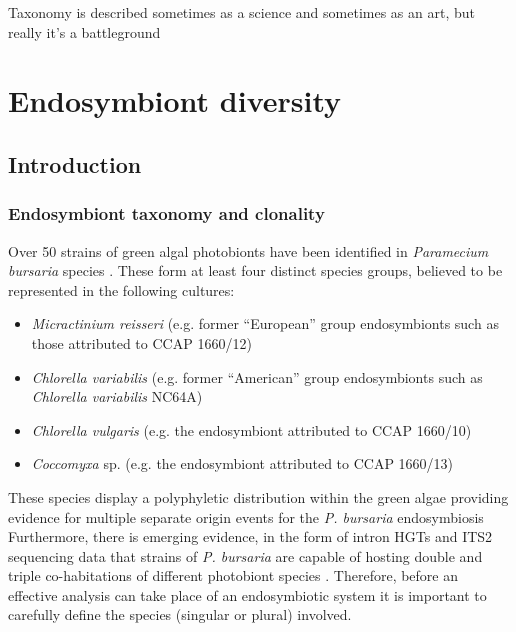 % 
\graphicspath{{chapters/3.Chapter_1/figures/}}


\begin{savequote}[75mm]
    Taxonomy is described sometimes as a science and sometimes as an art, but really it's a battleground
\end{savequote}

\chapter{Endosymbiont diversity}\label{chap:endo_diversity}

\section{Introduction}

\subsection{Endosymbiont taxonomy and clonality}

Over 50 strains of green algal photobionts have been identified in 
\textit{Paramecium bursaria} species \citep{Hoshina2010,Hoshina2004,Hoshina2009,Summerer2008,Vorobyev2009}. 
These form at least four distinct species groups, believed to be represented
in the following cultures:
\begin{itemize}
    \item \textit{Micractinium reisseri} (e.g. former ``European'' group endosymbionts such as those attributed to CCAP 1660/12)
    \item \textit{Chlorella variabilis} (e.g. former ``American'' group endosymbionts such as \textit{Chlorella variabilis} NC64A)
    \item \textit{Chlorella vulgaris} (e.g. the endosymbiont attributed to CCAP 1660/10)
    \item \textit{Coccomyxa} sp. (e.g. the endosymbiont attributed to CCAP 1660/13)
\end{itemize}
These species display a polyphyletic distribution within the green algae
providing evidence for multiple separate origin events for
the \textit{P. bursaria} endosymbiosis \citep{Hoshina2008,Hoshina2009}
Furthermore, there is emerging evidence, in the form
of intron HGTs and ITS2 sequencing data that strains of \textit{P. bursaria}
are capable of hosting double and triple co-habitations of different
photobiont species \citep{Hoshina2012}. Therefore,
before an effective analysis can take place of
an endosymbiotic system it is important
to carefully define the species (singular or plural)
involved.

